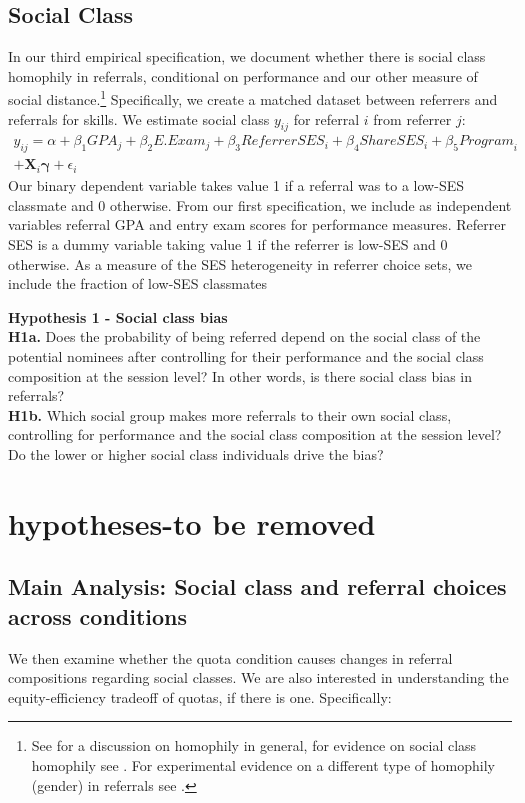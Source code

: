 \documentclass[11pt,a4paper,oneside]{article}
\begin{document}
\subsection{Social Class}
In our third empirical specification, we document whether there is social class homophily in referrals, conditional on performance and our other measure of social distance.\footnote{See \citet{mcpherson2001birds} for a discussion on homophily in general, for evidence on social class homophily see \citet{chetty2022social,chetty2022socialb}. For experimental evidence on a different type of homophily (gender) in referrals see \citet{beaman_job_2018}.} Specifically, we create a matched dataset between referrers and referrals for skills. We estimate social class $y_{ij}$ for referral $i$ from referrer $j$: 
\begin{multline}
    y_{ij} = \alpha + \beta_1{GPA}_{j} + \beta_2{E.Exam}_{j} + \beta_3{ReferrerSES}_{i} + \beta_4{ShareSES}_{i} + \beta_5{Program}_{i} \\ +\mathbf{X}_{i}\boldsymbol{\gamma} +  \epsilon_{i}    
\end{multline}
Our binary dependent variable takes value 1 if a referral was to a low-SES classmate and 0 otherwise. From our first specification, we include as independent variables referral GPA and entry exam scores for performance measures. Referrer SES is a dummy variable taking value 1 if the referrer is low-SES and 0 otherwise. As a measure of the SES heterogeneity in referrer choice sets, we include the fraction of low-SES classmates 



\noindent\textbf{Hypothesis 1 - Social class bias}\\
\noindent\textbf{H1a.} Does the probability of being referred depend on the social class of the potential nominees after controlling for their performance and the social class composition at the session level? In other words, is there social class bias in referrals?\\
\noindent\textbf{H1b.} Which social group makes more referrals to their own social class, controlling for performance and the social class composition at the session level? Do the lower or higher social class individuals drive the bias?

\section{hypotheses-to be removed}
\subsection{Main Analysis: Social class and referral choices across conditions}
We then examine whether the quota condition causes changes in referral compositions regarding social classes. We are also interested in understanding the equity-efficiency tradeoff of quotas, if there is one. Specifically:\\
\end{document}
